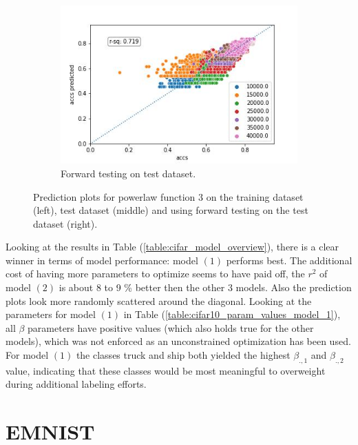 \documentclass{article} %
\begin{document}
\begin{figure}
    \begin{subfigure}{.33\textwidth}
        \centering
        \includegraphics[width=.8\linewidth]{cifar10/powerlaw_all_epochs_accs_hat_total_n_arctan_epoch_arctan_val_forward_testing.jpg}
        \caption{Forward testing on test dataset.}
        \label{fig:powerlaw_acc_total_n_arctan_epoch_arctan_forward_val}
    \end{subfigure}
    \caption{Prediction plots for powerlaw function 3 on the training dataset (left), test dataset (middle) and using forward testing on the test dataset (right).}
    \label{fig:powerlaw_prediction_plot_fct_3}
\end{figure}


Looking at the results in Table (\ref{table:cifar_model_overview}), there is a clear winner in terms of model performance: model $(1)$ performs best.
The additional cost of having more parameters to optimize seems to have paid off, the $r^2$ of model $(2)$ is about 8 to 9 \% better then the other 3 models.
Also the prediction plots look more randomly scattered around the diagonal.
Looking at the parameters for model $(1)$ in Table (\ref{table:cifar10_param_values_model_1}), all $\beta$ parameters have positive values (which also holds true for the other models), which was not enforced as an unconstrained optimization has been used.
For model $(1)$ the classes truck and ship both yielded the highest $\beta_{.,1}$ and $\beta_{.,2}$ value, indicating that these classes would be most meaningful to overweight during additional labeling efforts.

\section{EMNIST}
\end{document}
